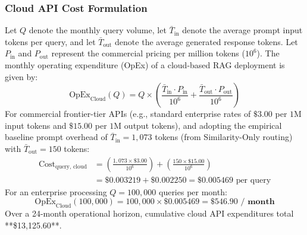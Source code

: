 \subsubsection{Cloud API Cost Formulation}
Let $Q$ denote the monthly query volume, let $\bar{T}_{\text{in}}$ denote the average prompt input tokens per query, and let $\bar{T}_{\text{out}}$ denote the average generated response tokens. Let $P_{\text{in}}$ and $P_{\text{out}}$ represent the commercial pricing per million tokens ($10^6$). The monthly operating expenditure (OpEx) of a cloud-based RAG deployment is given by:
\begin{equation}
    \text{OpEx}_{\text{Cloud}}(Q) = Q \times \left( \frac{\bar{T}_{\text{in}} \cdot P_{\text{in}}}{10^6} + \frac{\bar{T}_{\text{out}} \cdot P_{\text{out}}}{10^6} \right)
\end{equation}
For commercial frontier-tier APIs (e.g., standard enterprise rates of $\$3.00$ per $1\text{M}$ input tokens and $\$15.00$ per $1\text{M}$ output tokens), and adopting the empirical baseline prompt overhead of $\bar{T}_{\text{in}} = 1,073$ tokens (from Similarity-Only routing) with $\bar{T}_{\text{out}} = 150$ tokens:
\begin{equation}
    \begin{aligned}
        \text{Cost}_{\text{query, cloud}} &= \left( \frac{1{,}073 \times \$3.00}{10^6} \right) + \left( \frac{150 \times \$15.00}{10^6} \right) \\
        &= \$0.003219 + \$0.002250 = \$0.005469 \text{ per query}
    \end{aligned}
\end{equation}
For an enterprise processing $Q = 100,000$ queries per month:
\begin{equation}
    \text{OpEx}_{\text{Cloud}}(100{,}000) = 100{,}000 \times \$0.005469 = \mathbf{\$546.90 \text{ / month}}
\end{equation}
Over a 24-month operational horizon, cumulative cloud API expenditures total **\$13,125.60**.

